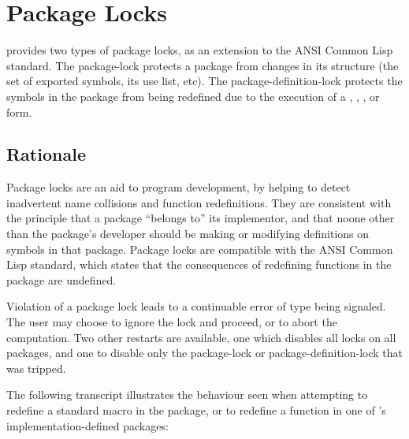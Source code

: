 \section{Package Locks}

\cmucl{} provides two types of package locks, as an extension to the
ANSI Common Lisp standard. The package-lock protects a package from
changes in its structure (the set of exported symbols, its use list,
etc). The package-definition-lock protects the symbols in the package
from being redefined due to the execution of a ,
, ,  or 
form.


\subsection{Rationale}

Package locks are an aid to program development, by helping to detect
inadvertent name collisions and function redefinitions. They are
consistent with the principle that a package ``belongs to'' its
implementor, and that noone other than the package's developer should
be making or modifying definitions on symbols in that package. Package
locks are compatible with the ANSI Common Lisp standard, which states
that the consequences of redefining functions in the
 package are undefined.

Violation of a package lock leads to a continuable error of type
 being signaled. The user may choose
to ignore the lock and proceed, or to abort the computation. Two other
restarts are available, one which disables all locks on all packages,
and one to disable only the package-lock or package-definition-lock
that was tripped.

The following transcript illustrates the behaviour seen when
attempting to redefine a standard macro in the 
package, or to redefine a function in one of \cmucl{}'s
implementation-defined packages:

